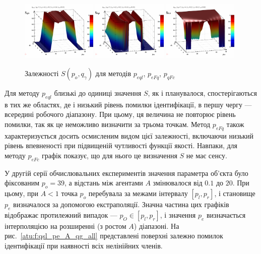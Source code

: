 \documentclass[a4paper,13pt]{atuaref}
\begin{document}
\begin{figure}[htb!]
  \centerline{
    \includegraphics[width=0.32\textwidth]{p3/p/qls_pe-p_po_qg_Sql_all.png}
    \hfill
    \includegraphics[width=0.32\textwidth]{p3/p/qls_pe-p_po_qg_SFq_all.png}
    \hfill
    \includegraphics[width=0.32\textwidth]{p3/p/qls_pe-p_po_qg_SFc_all.png}
  }
  \caption{Залежності $S(p_o,q_\gamma)$ для методів $p_{eql}$, $p_{eFq}$, $p_{qFc}$}
  \label{atu:f:qsl_S_po_qg_all}
\end{figure}

Для методу $ p_{eql} $ близькі до одиниці значення $ S $, як і планувалося,
спостерігаються в тих же областях, де і низький рівень помилки ідентифікації, в
першу чергу --- всередині робочого діапазону. При цьому, ця величина не
повторює рівень помилки, так як це неможливо визначити за трьома точкам. Метод
$ p_ {eFq} $ також характеризується досить осмисленим видом цієї залежності,
включаючи низький рівень впевненості при підвищеній чутливості функції якості.
Навпаки, для методу $ p_ {eFc} $ графік показує, що для нього це визначення $ S$ не має сенсу.

У другій серії обчислювальних експериментів значення параметра об'єкта було
фіксованим $ p_o = 39 $, а відстань між агентами $ A $ змінювалося від $ 0.1 $
до $ 20 $. При цьому, при $ A <1 $ точка $ p_o $ перебувала за межами інтервалу
$ [p_l, p_r] $, і становище $ p_e $ визначалося за допомогою екстраполяції.
Значна частина цих графіків відображає протилежний випадок --- $ p_O \in [p_l,p_r] $,
і значення $ p_e $ визначається інтерполяцією на розширенні (з ростом $A $) діапазоні.
На рис.~\ref{atu:f:qsl_pe_A_qg_all} представлені поверхні залежно помилок ідентифікації
при наявності всіх нелінійних членів.
\end{document}
